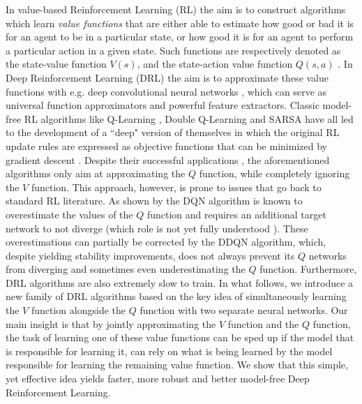 In value-based Reinforcement Learning (RL) the aim is to construct algorithms which learn \textit{value functions} that are either able to estimate how good or bad it is for an agent to be in a particular state, or how good it is for an agent to perform a particular action in a given state. Such functions are respectively denoted as the state-value function $V(s)$, and the state-action value function $Q(s,a)$ \cite{sutton2018reinforcement}. In Deep Reinforcement Learning (DRL) the aim is to approximate these value functions with e.g. deep convolutional neural networks \cite{lecun2015deep}, which can serve as universal function approximators and powerful feature extractors. Classic model-free RL algorithms like Q-Learning \cite{watkins1992q}, Double Q-Learning \cite{hasselt2010double} and SARSA \cite{rummery1994line} have all led to the development of a ``deep" version of themselves in which the original RL update rules are expressed as objective functions that can be minimized by gradient descent \cite{mnih2015human, van2016deep, zhao2016deep}. Despite their successful applications \cite{li2017deep}, the aforementioned algorithms only aim at approximating the $Q$ function, while completely ignoring the $V$ function. This approach, however, is prone to issues that go back to standard RL literature. As shown by \citet{van2016deep} the DQN algorithm \cite{mnih2015human} is known to overestimate the values of the $Q$ function and requires an additional target network to not diverge (which role is not yet fully understood \cite{achiam2019towards}). These overestimations can partially be corrected by the DDQN \cite{van2016deep} algorithm, which, despite yielding stability improvements, does not always prevent its $Q$ networks from diverging \cite{van2018deep} and sometimes even underestimating the $Q$ function. Furthermore, DRL algorithms are also extremely slow to train. In what follows, we introduce a new family of DRL algorithms based on the key idea of simultaneously learning the $V$ function alongside the $Q$ function with two separate neural networks. Our main insight is that by jointly approximating the $V$ function and the $Q$ function, the task of learning one of these value functions can be sped up if the model that is responsible for learning it, can rely on what is being learned by the model responsible for learning the remaining value function. We show that this simple, yet effective idea yields faster, more robust and better model-free Deep Reinforcement Learning.


